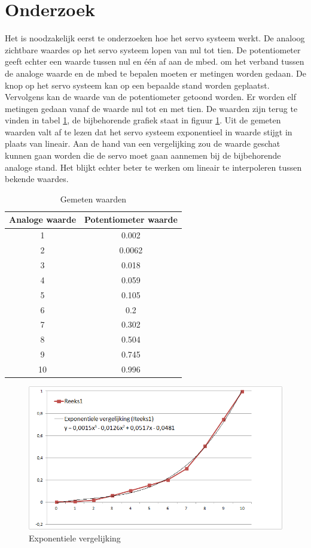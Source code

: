 \documentclass[a4paper]{article}
\begin{document}
	\section{Onderzoek}
		Het is noodzakelijk eerst te onderzoeken hoe het servo systeem werkt. De analoog zichtbare waardes op het servo systeem lopen van nul tot tien. De potentiometer geeft echter een waarde tussen nul en \'e\'en af aan de mbed. om het verband tussen de analoge waarde en de mbed te bepalen moeten er metingen worden gedaan. De knop op het servo systeem kan op een bepaalde stand worden geplaatst. Vervolgens kan de waarde van de potentiometer getoond worden. Er worden elf metingen gedaan vanaf de waarde nul tot en met tien. De waarden zijn terug te vinden in tabel \ref{tab:gemeten}, de bijbehorende grafiek staat in figuur \ref{fig:logaritmisch}. Uit de gemeten waarden valt af te lezen dat het servo systeem exponentieel in waarde stijgt in plaats van lineair. Aan de hand van een vergelijking zou de waarde geschat kunnen gaan worden die de servo moet gaan aannemen bij de bijbehorende analoge stand. Het blijkt echter beter te werken om lineair te interpoleren tussen bekende waardes.
	\begin{table}[h]
		\begin{centering}
			\begin{tabular}{| c | c |}
				\hline
				Analoge waarde & Potentiometer waarde \\ \hline\hline
				1 & 0.002 \\\hline
				2 & 0.0062 \\\hline
				3 & 0.018 \\\hline
				4 & 0.059 \\\hline
				5 & 0.105 \\\hline
				6 & 0.2 \\\hline
				7 & 0.302 \\\hline
				8 & 0.504 \\\hline
				9 & 0.745 \\\hline
				10 & 0.996 \\
				\hline
			\end{tabular}
			\caption{Gemeten waarden}
			\label{tab:gemeten}
		\end{centering}
	\end{table}
	\begin{figure}[h]
		\centering
		\includegraphics[scale=0.8]{imgs/logaritmisch.png}
		\caption{Exponentiele vergelijking}
		\label{fig:logaritmisch}
	\end{figure}
\end{document}
